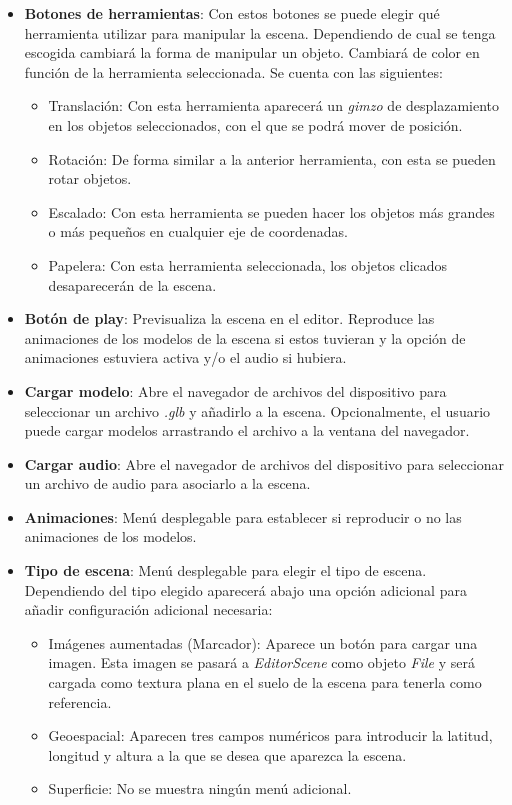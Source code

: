 \begin{itemize}
    \item \textbf{Botones de herramientas}: Con estos botones se puede elegir qué herramienta utilizar para manipular la escena. Dependiendo de cual se tenga escogida cambiará la forma de manipular un objeto. Cambiará de color en función de la herramienta seleccionada. Se cuenta con las siguientes:
        \begin{itemize}
            \item Translación: Con esta herramienta aparecerá un \textit{gimzo} de desplazamiento en los objetos seleccionados, con el que se podrá mover de posición.
            \item Rotación: De forma similar a la anterior herramienta, con esta se pueden rotar objetos.
            \item Escalado: Con esta herramienta se pueden hacer los objetos más grandes o más pequeños en cualquier eje de coordenadas.
            \item Papelera: Con esta herramienta seleccionada, los objetos clicados desaparecerán de la escena.
        \end{itemize}

    \item \textbf{Botón de play}: Previsualiza la escena en el editor. Reproduce las animaciones de los modelos de la escena si estos tuvieran y la opción de animaciones estuviera activa y/o el audio si hubiera.
    \item \textbf{Cargar modelo}: Abre el navegador de archivos del dispositivo para seleccionar un archivo \textit{.glb} y añadirlo a la escena. Opcionalmente, el usuario puede cargar modelos arrastrando el archivo a la ventana del navegador.
    \item \textbf{Cargar audio}: Abre el navegador de archivos del dispositivo para seleccionar un archivo de audio para asociarlo a la escena.
    \item \textbf{Animaciones}: Menú desplegable para establecer si reproducir o no las animaciones de los modelos.
    \item \textbf{Tipo de escena}: Menú desplegable para elegir el tipo de escena. Dependiendo del tipo elegido aparecerá abajo una opción adicional para añadir configuración adicional necesaria:
        \begin{itemize}
            \item Imágenes aumentadas (Marcador): Aparece un botón para cargar una imagen. Esta imagen se pasará a \textit{EditorScene} como objeto \textit{File} y será cargada como textura plana en el suelo de la escena para tenerla como referencia.
            \item Geoespacial: Aparecen tres campos numéricos para introducir la latitud, longitud y altura a la que se desea que aparezca la escena.
            \item Superficie: No se muestra ningún menú adicional.
        \end{itemize}
\end{itemize}

